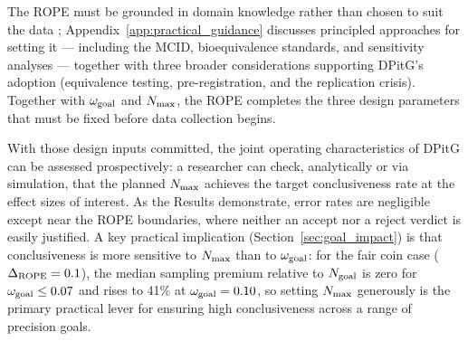 The ROPE must be grounded in domain knowledge rather than chosen to suit the data
\citep{kruschke2018}; Appendix~\ref{app:practical_guidance} discusses principled
approaches for setting it --- including the MCID, bioequivalence standards, and
sensitivity analyses --- together with three broader considerations supporting
DPitG's adoption (equivalence testing, pre-registration, and the replication crisis).
Together with $\omega_{\rm goal}$ and $N_{\rm max}$, the ROPE completes the three
design parameters that must be fixed before data collection begins.

With those design inputs committed, the joint operating characteristics of DPitG can
be assessed prospectively: a researcher can check, analytically or via simulation,
that the planned $N_{\rm max}$ achieves the target conclusiveness rate at the effect
sizes of interest.
As the Results demonstrate, error rates are negligible except near the ROPE boundaries,
where neither an accept nor a reject verdict is easily justified.
A key practical implication (Section~\ref{sec:goal_impact}) is that conclusiveness
is more sensitive to $N_{\rm max}$ than to $\omega_{\rm goal}$: for the fair coin
case ($\Delta_{\rm ROPE}=0.1$), the median sampling premium relative to $N_{\rm goal}$
is zero for $\omega_{\rm goal}\le 0.07$ and rises to 41\% at $\omega_{\rm goal}=0.10$,
so setting $N_{\rm max}$ generously is the primary practical lever for ensuring high
conclusiveness across a range of precision goals.

